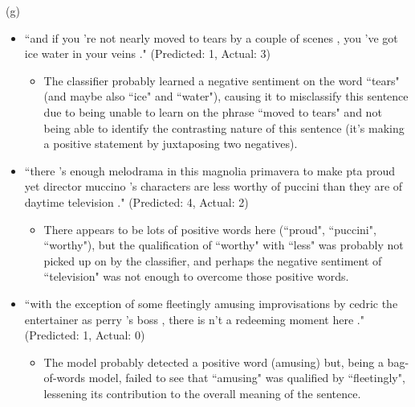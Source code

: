\documentclass{article}
\begin{document}
(g)
\begin{itemize}
\item ``and if you 're not nearly moved to tears by a couple of scenes , you 've got ice water in your veins ." (Predicted: 1, Actual: 3)
\begin{itemize}
\item The classifier probably learned a negative sentiment on the word ``tears" (and maybe also ``ice" and ``water"), causing it to misclassify this sentence due to being unable to learn on the phrase ``moved to tears" and not being able to identify the contrasting nature of this sentence (it's making a positive statement by juxtaposing two negatives).
\end{itemize}
\item ``there 's enough melodrama in this magnolia primavera to make pta proud yet director muccino 's characters are less worthy of puccini than they are of daytime television ." (Predicted: 4, Actual: 2)
\begin{itemize}
\item There appears to be lots of positive words here (``proud", ``puccini", ``worthy"), but the qualification of ``worthy" with ``less" was probably not picked up on by the classifier, and perhaps the negative sentiment of ``television" was not enough to overcome those positive words.
\end{itemize}
\item ``with the exception of some fleetingly amusing improvisations by cedric the entertainer as perry 's boss , there is n't a redeeming moment here ." (Predicted: 1, Actual: 0)
\begin{itemize}
\item The model probably detected a positive word (amusing) but, being a bag-of-words model, failed to see that ``amusing" was qualified by ``fleetingly", lessening its contribution to the overall meaning of the sentence.
\end{itemize}
\end{itemize}
\end{document}
